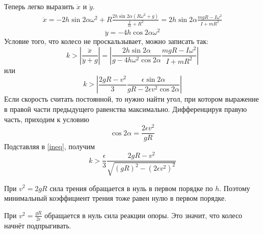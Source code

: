 \documentclass{article}
\begin{document}
	Теперь легко выразить $\ddot{x}$ и $\ddot{y}$.
	\begin{multline}
		\ddot{x} = -2h\sin{2\alpha}\omega^2 + 
		R \frac{2h\sin{2\alpha}(R\omega^2  + g)}{\frac{I}{m} + R^2}	=
		 2h\sin{2\alpha} \frac{mgR - I\omega^2}{I + mR^2}
	\end{multline}	
	\begin{equation}
		\ddot{y} = -4h\cos{2\alpha} \omega^2
	\end{equation}	
	Условие того, что колесо не проскальзывает, можно записать так:
	\begin{equation}
		k > \left|\frac{\ddot{x}}{\ddot{y} + g}\right| = 
		\left| \frac{2h\sin{2\alpha}}{g - 4h\omega^2\cos{2\alpha}}
			\frac{mgR - I\omega^2}{I + mR^2}\right|
	\end{equation}
	или
	\begin{equation}
		\label{ineq}
		k >
		\left| \frac{2gR - v^2}{3}
		\frac{\epsilon\sin{2\alpha}}{gR - 2\epsilon v^2\cos{2\alpha}}\right|
	\end{equation}
	Если скорость считать постоянной, то нужно найти угол, при котором выражение 
	в правой части предыдущего равенства максимально.
	Дифференцируя правую часть, приходим к условию
	\begin{equation}
		\cos{2\alpha} = \frac{2\epsilon v^2}{gR}
	\end{equation}
	Подставляя в \ref{ineq}, получим
	\begin{equation}
		k > \frac{\epsilon}{3} 
			\frac{2gR - v^2}{\sqrt{(gR)^2 - (2\epsilon v^2)^2}}
	\end{equation}

	При $v^2 = 2gR$ сила трения обращается в нуль в первом порядке по $h$.
	Поэтому минимальный коэффициент трения тоже равен нулю в первом порядке.
	
	При $v^2 = \frac{gR}{2\epsilon}$ обращается в нуль сила реакции опоры. Это значит, что 
	колесо начнёт подпрыгивать.
\end{document}
